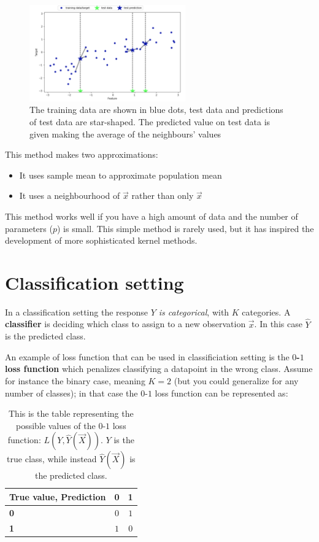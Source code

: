 \begin{figure}[ht]
\caption{The training data are shown in blue dots, test data and predictions of test data are star-shaped. The predicted value on test data is given making the average of the neighbours' values}
\centering
\includegraphics[width=0.6\textwidth]{KNNregression}
\end{figure}


      This method makes two approximations:
      \begin{itemize}
        \item It uses sample mean to approximate population mean
        \item It uses a neighbourhood of $\vec{x}$ rather than only $\vec{x}$
      \end{itemize}
      
      This method works well if you have a high amount of data and the number of
      parameters ($p$) is small. This simple method is rarely used, but it has
      inspired the development of more sophisticated kernel methods.

  \section{Classification setting}
    In a classification setting the response \textit{$Y$ is categorical}, with $K$
    categories. A \textbf{classifier} is deciding which class to assign to a new
    observation $\vec{x}$. In this case $\hat{Y}$ is the predicted class.
    
    An example of loss function that can be used in classificiation setting is
    the \textbf{$0$-$1$ loss function} which penalizes classifying a datapoint in
    the wrong class. Assume for instance the binary case, meaning $K = 2$ (but
    you could generalize for any number of classes); in that case the $0$-$1$ loss
    function can be represented as:
    
\begin{table}[h]
\centering
\begin{tabular}{|l||c|c|}
	\hline
	\textbf{True value, Prediction} & \textbf{0} & \textbf{1} \\
	\hline
	\hline
	\textbf{0} &  $0$ & $1$ \\
	\hline
	\textbf{\textbf{1}} & $1$ & $0$\\
	\hline
\end{tabular}
\caption{This is the table representing the possible values of the $0$-$1$ loss
function: $ L(Y, \hat{Y}(\vec{X})) $. $Y$ is the true class, while instead
$\hat{Y}(\vec{X})$ is the predicted class.}
\end{table} 
    

